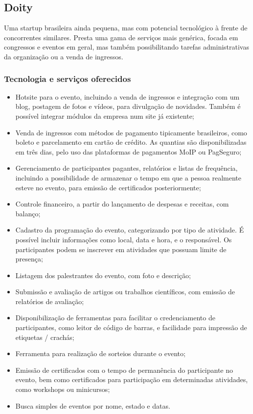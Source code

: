 \documentclass[12pt,a4paper,twoside,hyphens,english,brazil]{abntex2}
\begin{document}
\subsection{Doity}
Uma startup brasileira ainda pequena, mas com potencial tecnológico à frente de concorrentes similares. Presta uma gama de serviços mais genérica, focada em congressos e eventos em geral, mas também possibilitando tarefas administrativas da organização ou a venda de ingressos.\cite{doity-como-funciona}

\subsubsection*{Tecnologia e serviços oferecidos}
\begin{itemize}[itemsep=-1ex]
	\item Hotsite para o evento, incluindo a venda de ingressos e integração com um blog, postagem de fotos e vídeos, para divulgação de novidades. Também é possível integrar módulos da empresa num site já existente;
	\item Venda de ingressos com métodos de pagamento tipicamente brasileiros, como boleto e parcelamento em cartão de crédito. As quantias são disponibilizadas em três dias, pelo uso das plataformas de pagamentos MoIP ou PagSeguro;
	\item Gerenciamento de participantes pagantes, relatórios e listas de frequência, incluindo a possibilidade de armazenar o tempo em que a pessoa realmente esteve no evento, para emissão de certificados posteriormente;
	\item Controle financeiro, a partir do lançamento de despesas e receitas, com balanço;
	\item Cadastro da programação do evento, categorizando por tipo de atividade. É possível incluir informações como local, data e hora, e o responsável. Os participantes podem se inscrever em atividades que possuam limite de presença;
	\item Listagem dos palestrantes do evento, com foto e descrição;
	\item Submissão e avaliação de artigos ou trabalhos científicos, com emissão de relatórios de avaliação;
	\item Disponibilização de ferramentas para facilitar o credenciamento de participantes, como leitor de código de barras, e facilidade para impressão de etiquetas / crachás;
	\item Ferramenta para realização de sorteios durante o evento;
	\item Emissão de certificados com o tempo de permanência do participante no evento, bem como certificados para participação em determinadas atividades, como workshops ou minicursos;
	\item Busca simples de eventos por nome, estado e datas.
\end{itemize}
\end{document}
